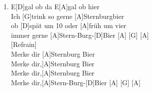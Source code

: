 \def\Titel{Merke dir Sternburg Bier}
\def\Interpret{Die BÄND}
\def\Referenz{Eine Hommage an das beste Bier der Welt}

\LiedSetup{}

\begin{guitarMagic}
    \begin{enumerate}

        \item E[D]gal ob da E[A]gal ob hier\\
            Ich [G]trink so gerne [A]Sternburgbier\\
            ob [D]spät um 10 oder [A]früh um vier\\
            [G]immer gerne [A]Stern-Burg-[D]Bier 
            \hspace{7pt} [A] \hspace{7pt}[G] \hspace{7pt}[A]\\

            [Refrain]\\
            [D]Merke dir [A]Sternburg Bier\\
            [G]Merke dir,[A]Sternburg Bier\\
            [D]Merke dir,[A]Sternburg Bier\\
            [G]Merke dir,[A]Stern-Burg-[D]Bier
            \hspace{7pt} [A] \hspace{7pt}[G] \hspace{7pt}[A]


\end{enumerate}
\end{guitarMagic}

